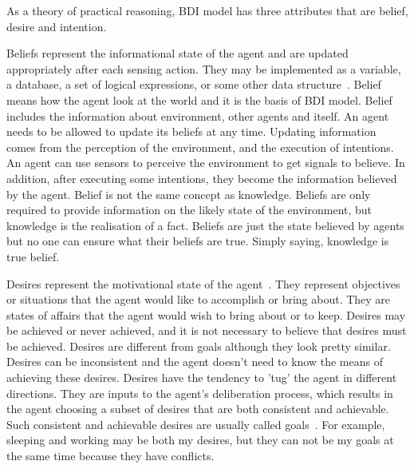 As a theory of practical reasoning, BDI model has three attributes that are belief, desire and intention.

Beliefs represent the informational state of the agent and are updated appropriately after each sensing action.
They may be implemented as a variable, a database, a set of logical expressions, or some other data structure~\cite{Rao_BDITheory_1995}.
Belief means how the agent look at the world and it is the basis of BDI model.
Belief includes the information about environment, other agents and itself.
An agent needs to be allowed to update its beliefs at any time.
Updating information comes from the perception of the environment, and the execution of intentions.
An agent can use sensors to perceive the environment to get signals to believe.
In addition, after executing some intentions, they become the information believed by the agent.
Belief is not the same concept as knowledge.
Beliefs are only required to provide information on the likely state of the environment, but knowledge is the realisation of a fact.
Beliefs are just the state believed by agents but no one can ensure what their beliefs are true.
Simply saying, knowledge is true belief.

Desires represent the motivational state of the agent~\cite{Rao_BDITheory_1995}.
They represent objectives or situations that the agent would like to accomplish or bring about.
They are states of affairs that the agent would wish to bring about or to keep.
Desires may be achieved or never achieved, and it is not necessary to believe that desires must be achieved.
Desires are different from goals although they look pretty similar.
Desires can be inconsistent and the agent doesn't need to know the means of achieving these desires.
Desires have the tendency to 'tug' the agent in different directions.
They are inputs to the agent's deliberation process, which results in the agent choosing a subset of desires that are both consistent and achievable.
Such consistent and achievable desires are usually called goals~\cite{Gerhard_MultiSystem_1999}.
For example, sleeping and working may be both my desires, but they can not be my goals at the same time because they have conflicts.

